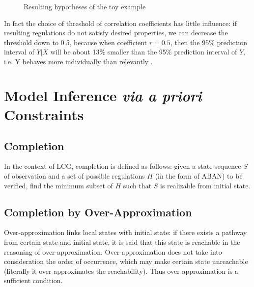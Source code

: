 \begin{figure}[ht]
\centering
{}

\caption{Resulting hypotheses of the toy example}\label{ResultBRN}
\end{figure}
In fact the choice of threshold of correlation coefficients has little influence: if resulting regulations do not satisfy desired properties, we can decrease the threshold down to 0.5, because when coefficient $r =0.5$, then the 95\% prediction interval of $Y|X$ will be about 13\% smaller than the 95\% prediction interval of $Y$, i.e. Y behaves more individually than relevantly \cite{hull1927correlation}.
\section{Model Inference \textit{via a priori} Constraints}
\subsection{Completion}
In the context of LCG, completion is defined as follows: given a state sequence $S$ of observation and a set of possible regulations $H$ (in the form of ABAN) to be verified,  find the minimum subset of $H$ such that $S$ is realizable from initial state. 
\subsection{Completion by Over-Approximation}
Over-approximation links local states with initial state: if there exists a pathway from certain state and initial state, it is said that this state is reachable in the reasoning of over-approximation. Over-approximation does not take into consideration the order of occurrence, which may make certain state unreachable (literally it over-approximates the reachability). Thus over-approximation is a sufficient condition.

